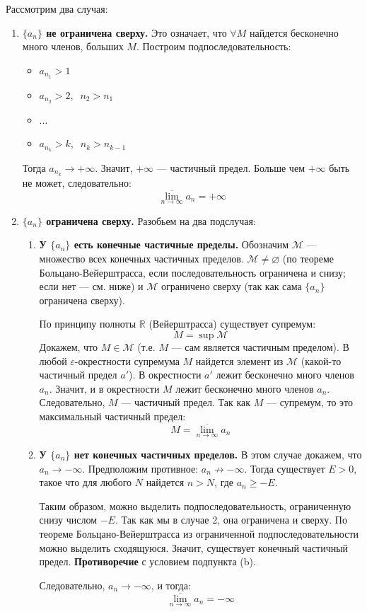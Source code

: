 \begin{tcolorbox}[title=Доказательство (для верхнего предела), breakable]
	Рассмотрим два случая:
	\begin{enumerate}
		\item \textbf{$\{a_n\}$ не ограничена сверху.}
			Это означает, что $\forall M$ найдется бесконечно много членов, больших $M$. Построим подпоследовательность:
			\begin{itemize}
			    \item $a_{n_1} > 1$
			    \item $a_{n_2} > 2, \;\; n_2 > n_1$
			    \item $\dots$
			    \item $a_{n_k} > k, \;\; n_k > n_{k - 1}$
			\end{itemize}
			Тогда $a_{n_k} \to +\infty$. Значит, $+\infty$ — частичный предел.
			Больше чем $+\infty$ быть не может, следовательно:
			\[ \overline{\lim_{n\to\infty}} a_n = +\infty \]

		\item \textbf{$\{a_n\}$ ограничена сверху.}
			Разобьем на два подслучая:
			\begin{enumerate}
				\item \textbf{У $\{a_n\}$ есть конечные частичные пределы.}
					Обозначим $\mathcal{M}$ — множество всех конечных частичных пределов.
					$\mathcal{M} \neq \varnothing$ (по теореме Больцано-Вейерштрасса, если последовательность ограничена и снизу; если нет — см. ниже) и $\mathcal{M}$ ограничено сверху (так как сама $\{a_n\}$ ограничена сверху).
					
					По принципу полноты $\mathbb{R}$ (Вейерштрасса) существует супремум:
					\[ M = \sup \mathcal{M} \]
					Докажем, что $M \in \mathcal{M}$ (т.е. $M$ — сам является частичным пределом).
					В любой $\varepsilon$-окрестности супремума $M$ найдется элемент из $\mathcal{M}$ (какой-то частичный предел $a'$). В окрестности $a'$ лежит бесконечно много членов $a_n$. Значит, и в окрестности $M$ лежит бесконечно много членов $a_n$.
					Следовательно, $M$ — частичный предел.
					Так как $M$ — супремум, то это максимальный частичный предел:
					\[ M = \overline{\lim_{n\to\infty}} a_n \]

				\item \textbf{У $\{a_n\}$ нет конечных частичных пределов.}
					В этом случае докажем, что $a_n \to -\infty$.
					Предположим противное: $a_n \not\to -\infty$.
					Тогда существует $E > 0$, такое что для любого $N$ найдется $n > N$, где $a_n \ge -E$.
					
					Таким образом, можно выделить подпоследовательность, ограниченную снизу числом $-E$. Так как мы в случае 2, она ограничена и сверху.
					По теореме Больцано-Вейерштрасса из ограниченной подпоследовательности можно выделить сходящуюся.
					Значит, существует конечный частичный предел. \textbf{Противоречие} с условием подпункта (b).
					
					Следовательно, $a_n \to -\infty$, и тогда:
					\[ \overline{\lim_{n\to\infty}} a_n = -\infty \]
			\end{enumerate}
	\end{enumerate}
\end{tcolorbox}
